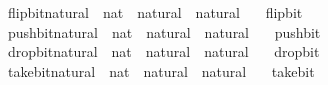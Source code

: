 \begin{isabellebody}
%
\isatagproof
\isacommand{{\isachardot}{\kern0pt}}\isamarkupfalse%
%
\endisatagproof
{\isafoldproof}%
%
\isadelimproof
%
\endisadelimproof
\isanewline
\isanewline
{}\isamarkupfalse%
\ flip{\isacharunderscore}{\kern0pt}bit{\isacharunderscore}{\kern0pt}natural\ {\isacharcolon}{\kern0pt}{\isacharcolon}{\kern0pt}\ {\isacartoucheopen}nat\ {\isasymRightarrow}\ natural\ {\isasymRightarrow}\ natural{\isacartoucheclose}\isanewline
\ \ \ flip{\isacharunderscore}{\kern0pt}bit%
\isadelimproof
\ %
\endisadelimproof
%
\isatagproof
\isacommand{{\isachardot}{\kern0pt}}\isamarkupfalse%
%
\endisatagproof
{\isafoldproof}%
%
\isadelimproof
%
\endisadelimproof
\isanewline
\isanewline
{}\isamarkupfalse%
\ push{\isacharunderscore}{\kern0pt}bit{\isacharunderscore}{\kern0pt}natural\ {\isacharcolon}{\kern0pt}{\isacharcolon}{\kern0pt}\ {\isacartoucheopen}nat\ {\isasymRightarrow}\ natural\ {\isasymRightarrow}\ natural{\isacartoucheclose}\isanewline
\ \ \ push{\isacharunderscore}{\kern0pt}bit%
\isadelimproof
\ %
\endisadelimproof
%
\isatagproof
\isacommand{{\isachardot}{\kern0pt}}\isamarkupfalse%
%
\endisatagproof
{\isafoldproof}%
%
\isadelimproof
%
\endisadelimproof
\isanewline
\isanewline
{}\isamarkupfalse%
\ drop{\isacharunderscore}{\kern0pt}bit{\isacharunderscore}{\kern0pt}natural\ {\isacharcolon}{\kern0pt}{\isacharcolon}{\kern0pt}\ {\isacartoucheopen}nat\ {\isasymRightarrow}\ natural\ {\isasymRightarrow}\ natural{\isacartoucheclose}\isanewline
\ \ \ drop{\isacharunderscore}{\kern0pt}bit%
\isadelimproof
\ %
\endisadelimproof
%
\isatagproof
\isacommand{{\isachardot}{\kern0pt}}\isamarkupfalse%
%
\endisatagproof
{\isafoldproof}%
%
\isadelimproof
%
\endisadelimproof
\isanewline
\isanewline
{}\isamarkupfalse%
\ take{\isacharunderscore}{\kern0pt}bit{\isacharunderscore}{\kern0pt}natural\ {\isacharcolon}{\kern0pt}{\isacharcolon}{\kern0pt}\ {\isacartoucheopen}nat\ {\isasymRightarrow}\ natural\ {\isasymRightarrow}\ natural{\isacartoucheclose}\isanewline
\ \ \ take{\isacharunderscore}{\kern0pt}bit%
\isadelimproof
\ %
\endisadelimproof
%
\isatagproof
\isacommand{{\isachardot}{\kern0pt}}\isamarkupfalse%
%
\endisatagproof
{\isafoldproof}%
%
\isadelimproof
%
\endisadelimproof
\isanewline
\isanewline
{}\isamarkupfalse%
%
\isadelimproof
\ %
\endisadelimproof
%
\isatagproof
{}\isamarkupfalse%

\end{isabellebody}
